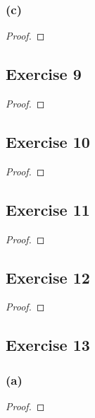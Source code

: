 \documentclass[14pt]{extarticle}
\begin{document}
\subsubsection{(c)}

\begin{proof}

\end{proof}

\subsection{Exercise 9}

\begin{proof}

\end{proof}

\subsection{Exercise 10}

\begin{proof}

\end{proof}

\subsection{Exercise 11}

\begin{proof}

\end{proof}

\subsection{Exercise 12}

\begin{proof}

\end{proof}

\subsection{Exercise 13}

\subsubsection{(a)}

\begin{proof}

\end{proof}
\end{document}
